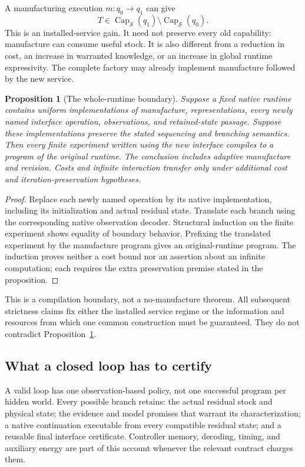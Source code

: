 \documentclass[11pt]{article}
\newtheorem{proposition}[theorem]{Proposition}
\theoremstyle{definition}
\theoremstyle{remark}
\begin{document}
A manufacturing execution $m:q_0\to q_1$ can give
\[
 T\in\operatorname{Cap}_{\mathcal S}(q_1)
       \setminus\operatorname{Cap}_{\mathcal S}(q_0).
\]
This is an installed-service gain. It need not preserve every old
capability: manufacture can consume useful stock. It is also different
from a reduction in cost, an increase in warranted knowledge, or an
increase in global runtime expressivity. The complete factory may
already implement manufacture followed by the new service.

\begin{proposition}[The whole-runtime boundary]\label{prop:whole-runtime}
Suppose a fixed native runtime contains uniform implementations of
manufacture, representations, every newly named interface operation,
observations, and retained-state passage. Suppose these implementations
preserve the stated sequencing and branching semantics. Then every
finite experiment written using the new interface compiles to a program
of the original runtime. The conclusion includes adaptive manufacture
and revision. Costs and infinite interaction transfer only under
additional cost and iteration-preservation hypotheses.
\end{proposition}
\begin{proof}
Replace each newly named operation by its native implementation,
including its initialization and actual residual state. Translate each
branch using the corresponding native observation decoder. Structural
induction on the finite experiment shows equality of boundary behavior.
Prefixing the translated experiment by the manufacture program gives an
original-runtime program. The induction proves neither a cost bound nor
an assertion about an infinite computation; each requires the extra
preservation premise stated in the proposition.
\end{proof}
This is a compilation boundary, not a no-manufacture theorem. All
subsequent strictness claims fix either the installed service regime or
the information and resources from which one common construction must
be guaranteed. They do not contradict Proposition~\ref{prop:whole-runtime}.

\subsection{What a closed loop has to certify}
A valid loop has one observation-based policy, not one successful program
per hidden world. Every possible branch retains: the actual residual
stock and physical state; the evidence and model promises that warrant
its characterization; a native continuation executable from every
compatible residual state; and a reusable final interface certificate.
Controller memory, decoding, timing, and auxiliary energy are part of
this account whenever the relevant contract charges them.
\end{document}
